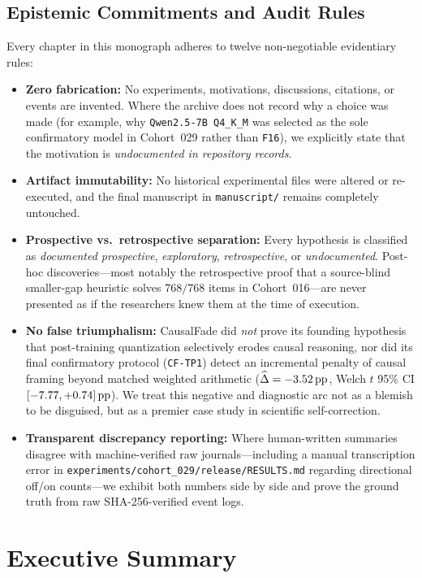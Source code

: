 \section*{Epistemic Commitments and Audit Rules}

Every chapter in this monograph adheres to twelve non-negotiable evidentiary rules:
\begin{itemize}
  \item \textbf{Zero fabrication:} No experiments, motivations, discussions, citations, or events are invented. Where the archive does not record why a choice was made (for example, why \texttt{Qwen2.5-7B Q4\_K\_M} was selected as the sole confirmatory model in Cohort~029 rather than \texttt{F16}), we explicitly state that the motivation is \emph{undocumented in repository records}.
  \item \textbf{Artifact immutability:} No historical experimental files were altered or re-executed, and the final manuscript in \texttt{manuscript/} remains completely untouched.
  \item \textbf{Prospective vs.\ retrospective separation:} Every hypothesis is classified as \emph{documented prospective}, \emph{exploratory}, \emph{retrospective}, or \emph{undocumented}. Post-hoc discoveries---most notably the retrospective proof that a source-blind smaller-gap heuristic solves $768/768$ items in Cohort~016---are never presented as if the researchers knew them at the time of execution.
  \item \textbf{No false triumphalism:} CausalFade did \emph{not} prove its founding hypothesis that post-training quantization selectively erodes causal reasoning, nor did its final confirmatory protocol (\texttt{CF-TP1}) detect an incremental penalty of causal framing beyond matched weighted arithmetic ($\widehat{\Delta} = -3.52\,\mathrm{pp}$, Welch $t$ 95\% CI $[-7.77, +0.74]\,\mathrm{pp}$). We treat this negative and diagnostic arc not as a blemish to be disguised, but as a premier case study in scientific self-correction.
  \item \textbf{Transparent discrepancy reporting:} Where human-written summaries disagree with machine-verified raw journals---including a manual transcription error in \texttt{experiments/cohort\_029/release/RESULTS.md} regarding directional off/on counts---we exhibit both numbers side by side and prove the ground truth from raw SHA-256-verified event logs.
\end{itemize}

\chapter*{Executive Summary}

